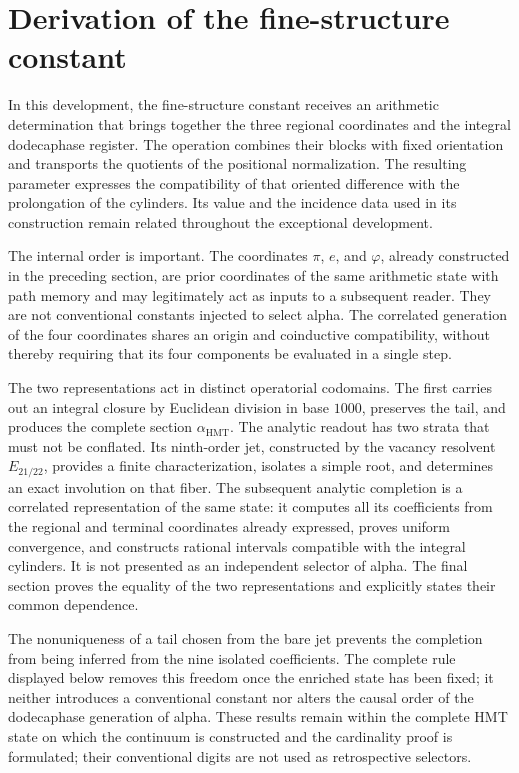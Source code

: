 \section{Derivation of the fine-structure constant}
\label{sec:alpha}

In this development, the fine-structure constant receives an arithmetic
determination that brings together the three regional coordinates and the
integral dodecaphase register. The operation combines their blocks with fixed
orientation and transports the quotients of the positional normalization.
The resulting parameter expresses the compatibility of that oriented
difference with the prolongation of the cylinders. Its value and the
incidence data used in its construction remain related throughout the
exceptional development.

The internal order is important. The coordinates \(\pi\), \(e\), and
\(\varphi\), already constructed in the preceding section, are prior
coordinates of the same arithmetic state with path memory and may
legitimately act as inputs to a subsequent reader. They are not conventional
constants injected to select alpha. The correlated generation of the four
coordinates shares an origin and coinductive compatibility, without thereby
requiring that its four components be evaluated in a single step.

The two representations act in distinct operatorial codomains. The first carries
out an integral closure by Euclidean division in base \(1000\), preserves the
tail, and produces the complete section \(\alpha_{\mathrm{HMT}}\). The
analytic readout has two strata that must not be conflated. Its ninth-order
jet, constructed by the vacancy resolvent \(E_{21/22}\), provides a finite
characterization, isolates a simple root, and determines an exact involution
on that fiber. The subsequent analytic completion is a correlated
representation of the same state: it computes all its coefficients from the
regional and terminal coordinates already expressed, proves uniform
convergence, and constructs rational intervals compatible with the integral
cylinders. It is not presented as an independent selector of alpha. The final
section proves the equality of the two representations and explicitly states
their common dependence.

The nonuniqueness of a tail chosen from the bare jet prevents the completion
from being inferred from the nine isolated coefficients. The complete rule
displayed below removes this freedom once the enriched state has been fixed;
it neither introduces a conventional constant nor alters the causal order of
the dodecaphase generation of alpha. These results remain within the complete
HMT state on which the continuum is constructed and the cardinality proof is
formulated; their conventional digits are not used as retrospective
selectors.

